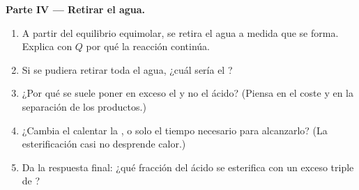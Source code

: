 \begin{problem}
\medskip
\noindent\textbf{Parte IV --- Retirar el agua.}
\begin{enumerate}[resume]
  \item A partir del equilibrio equimolar, se retira el agua a medida
        que se forma. Explica con $Q$ por qué la reacción continúa.
  \item Si se pudiera retirar toda el agua, ¿cuál sería el ?
  \item ¿Por qué se suele poner en exceso el  y no el ácido?
        (Piensa en el coste y en la separación de los productos.)
  \item ¿Cambia el  calentar la , o solo el tiempo
        necesario para alcanzarlo? (La esterificación casi no desprende
        calor.)
  \item Da la respuesta final: ¿qué fracción del ácido se esterifica con
        un exceso triple de ?
\end{enumerate}
\end{problem}
